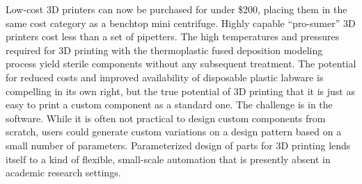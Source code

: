 \begin{refsection}
Low-cost 3D printers can now be purchased for under \$200, placing them in the same cost category as a benchtop mini centrifuge. Highly capable ``pro-sumer'' 3D printers cost less than a set of pipetters. The high temperatures and pressures required for 3D printing with the thermoplastic fused deposition modeling process yield sterile components without any subsequent treatment. The potential for reduced costs and improved availability of disposable plastic labware is compelling in its own right, but the true potential of 3D printing that it is just as easy to print a custom component as a standard one. The challenge is in the software. While it is often not practical to design custom components from scratch, users could generate custom variations on a design pattern based on a small number of parameters. Parameterized design of parts for 3D printing lends itself to a kind of flexible, small-scale automation that is presently absent in academic research settings.

\printbibliography[heading=subbibliography]

\end{refsection}